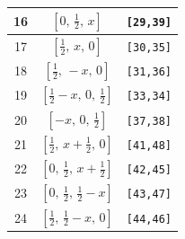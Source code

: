 \documentclass[fleqn,8pt]{jsarticle}
\begin{document}
\begin{longtable}{ccc}
16 & $\left[ 0,\, \frac{1}{2},\, x \right]$ & {\tt [29,39]} \\ \hline
17 & $\left[ \frac{1}{2},\, x,\, 0 \right]$ & {\tt [30,35]} \\ \hline
18 & $\left[ \frac{1}{2},\, - x,\, 0 \right]$ & {\tt [31,36]} \\ \hline
19 & $\left[ \frac{1}{2} - x,\, 0,\, \frac{1}{2} \right]$ & {\tt [33,34]} \\ \hline
20 & $\left[ - x,\, 0,\, \frac{1}{2} \right]$ & {\tt [37,38]} \\ \hline
21 & $\left[ \frac{1}{2},\, x + \frac{1}{2},\, 0 \right]$ & {\tt [41,48]} \\ \hline
22 & $\left[ 0,\, \frac{1}{2},\, x + \frac{1}{2} \right]$ & {\tt [42,45]} \\ \hline
23 & $\left[ 0,\, \frac{1}{2},\, \frac{1}{2} - x \right]$ & {\tt [43,47]} \\ \hline
24 & $\left[ \frac{1}{2},\, \frac{1}{2} - x,\, 0 \right]$ & {\tt [44,46]} \\
\end{longtable}
\renewcommand{\arraystretch}{1.2}
\end{document}
